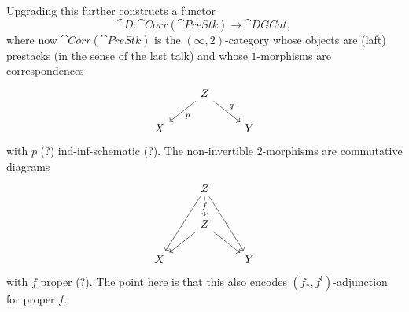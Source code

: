\documentclass{ck-article}
\newcommand\catDGCat{\cat{DGCat}}
\newcommand\catPreStk{\cat{PreStk}}
\newcommand\catCorrPreStk{\cat{Corr}(\catPreStk)}
\begin{document}
Upgrading this further \cite{GaitsgoryRozenblyum:2017:StudyInDAG:2} constructs a functor
\[
    \cat{D}\colon \catCorrPreStk \to \catDGCat,
\]
where now $\catCorrPreStk$ is the $(\infty, 2)$-category whose objects are (laft) prestacks (in the sense of the last talk) and whose $1$-morphisms are correspondences
\[
    \begin{tikzcd}
        & Z \arrow[dl, "p"] \arrow[dr, "q"] & \\
        X & & Y
    \end{tikzcd}
\]
with $p$ (?) ind-inf-schematic (?).
The non-invertible $2$-morphisms are commutative diagrams
\[
    \begin{tikzcd}
        & Z \arrow[ddl]  \arrow[ddr] \arrow[d, "f" description] & \\
        & Z \arrow[dl]  \arrow[dr] & \\
        X & & Y
    \end{tikzcd}
\]
with $f$ proper (?).
The point here is that this also encodes $(f_*, f^!)$-adjunction for proper $f$.

\printbibliography
\end{document}
